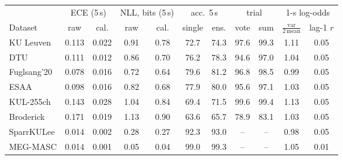 \begin{tabular}{lcccccccccc}\toprule
& \multicolumn{2}{c}{ECE (5\,s)} & \multicolumn{2}{c}{NLL, bits (5\,s)} & \multicolumn{2}{c}{acc.\ 5\,s} & \multicolumn{2}{c}{trial} & \multicolumn{2}{c}{1-s log-odds} \\
Dataset & raw & cal. & raw & cal. & single & ens. & vote & sum & $\frac{\mathrm{var}}{2\,\mathrm{mean}}$ & lag-1 $r$ \\\midrule
KU Leuven & 0.113 & 0.022 & 0.91 & 0.78 & 72.7 & 74.3 & 97.6 & 99.3 & 1.11 & 0.05 \\
DTU & 0.111 & 0.012 & 0.86 & 0.70 & 76.2 & 78.3 & 94.6 & 97.0 & 1.04 & 0.05 \\
Fuglsang'20 & 0.078 & 0.016 & 0.72 & 0.64 & 79.6 & 81.2 & 96.8 & 98.5 & 0.99 & 0.05 \\
ESAA & 0.098 & 0.016 & 0.82 & 0.68 & 77.9 & 80.0 & 95.6 & 97.1 & 1.03 & 0.05 \\
KUL-255ch & 0.143 & 0.028 & 1.04 & 0.84 & 69.4 & 71.5 & 99.6 & 99.4 & 1.13 & 0.05 \\
Broderick & 0.171 & 0.019 & 1.13 & 0.90 & 63.6 & 65.7 & 78.9 & 83.1 & 1.03 & 0.05 \\
SparrKULee & 0.014 & 0.002 & 0.28 & 0.27 & 92.3 & 93.0 & -- & -- & 0.98 & 0.05 \\
MEG-MASC & 0.014 & 0.001 & 0.05 & 0.04 & 99.0 & 99.3 & -- & -- & 1.05 & 0.01 \\
\bottomrule\end{tabular}
